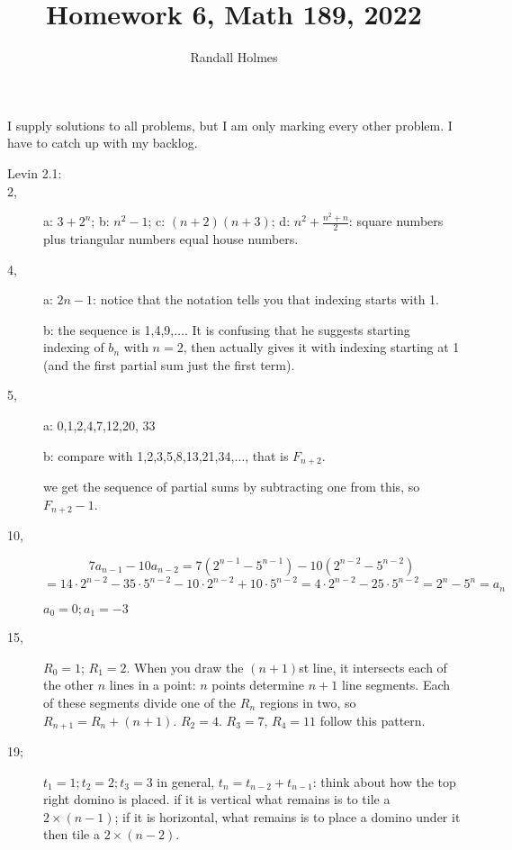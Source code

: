 \documentclass[12pt]{article}
\title{Homework 6, Math 189, 2022}
\author{Randall Holmes}
\begin{document}
\maketitle

I supply solutions to all problems, but I am only marking every other problem.  I have to catch up with my backlog.

\begin{description}

\item[Levin 2.1:]  

\item[ 2,]  a:  $3+2^n$; b: $n^2-1$; c: $(n+2)(n+3)$; d: $n^2+\frac{n^2+n}2$:  square numbers plus triangular numbers equal house numbers.

\item[4, ]  a:  $2n-1$:  notice that the notation tells you that indexing starts with 1.

b:  the sequence is 1,4,9,$\ldots$.  It is confusing that he suggests starting indexing of $b_n$ with $n=2$, then
actually gives it with indexing starting at 1 (and the first partial sum just the first term).

\item[5,]  a:  0,1,2,4,7,12,20, 33

b: compare with 1,2,3,5,8,13,21,34,$\ldots$, that is $F_{n+2}$.

we get the sequence of partial sums by subtracting one from this, so $F_{n+2}-1$.

\item[10, ]  $$7a_{n-1}-10a_{n-2}= 7(2^{n-1} -5^{n-1})-10(2^{n-2}-5^{n-2}) $$ $$= 14\cdot2^{n-2} - 35\cdot5^{n-2}-10\cdot2^{n-2}+10\cdot5^{n-2} = 4\cdot2^{n-2} - 25\cdot5^{n-2} = 2^n - 5^n = a_n$$

$a_0 = 0;  a_1= -3$

\item[15,]  $R_0 = 1$; $R_1=2$.  When you draw the $(n+1)$st line, it intersects each of the other $n$ lines in a point:
$n$ points determine $n+1$ line segments.  Each of these segments divide one of the $R_n$ regions in two,
so $R_{n+1}=R_n+(n+1)$.  $R_2 = 4$. $R_3=7$, $R_4 = 11$ follow this pattern.

 \item[19; ] $t_1=1;t_2=2;t_3=3$  in general, $t_{n} = t_{n-2} + t_{n-1}$:  think about how the top right domino is placed.
if it is vertical what remains is to tile a $2 \times (n-1)$;  if it is horizontal, what remains is to place a domino under it
then tile a $2 \times (n-2)$.


\end{description}
\end{document}
